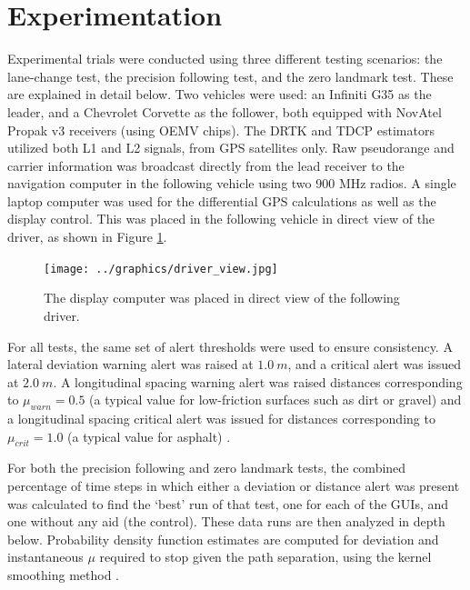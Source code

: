 \documentclass[twocolumn,10pt]{article}
\begin{document}

\section*{Experimentation}

  Experimental trials were conducted using three different testing scenarios: the lane-change test, the precision following test, and the zero landmark test.  These are explained in detail below.
  Two vehicles were used: an Infiniti G35 as the leader, and a Chevrolet Corvette as the follower, both equipped with NovAtel Propak v3 receivers (using OEMV chips).  The DRTK and TDCP estimators utilized both L1 and L2 signals, from GPS satellites only.  Raw pseudorange and carrier information was broadcast directly from the lead receiver to the navigation computer in the following vehicle using two 900 MHz radios.
  A single laptop computer was used for the differential GPS calculations as well as the display control. This was placed in the following vehicle in direct view of the driver, as shown in Figure \ref{fig:driver_view}.

  \begin{figure}[ht] \centering
    \texttt{[image: ../graphics/driver\_view.jpg]}
    \caption{The display computer was placed in direct view of the following driver.}
    \label{fig:driver_view}
  \end{figure}

  For all tests, the same set of alert thresholds were used to ensure consistency. A lateral deviation warning alert was raised at $1.0~m$, and a critical alert was issued at $2.0~m$. A longitudinal spacing warning alert was raised distances corresponding to $\mu_{warn} = 0.5$ (a typical value for low-friction surfaces such as dirt or gravel) and a longitudinal spacing critical alert was issued for distances corresponding to $\mu_{crit}=1.0$ (a typical value for asphalt) \cite{mu}.

  For both the precision following and zero landmark tests, the combined percentage of time steps in which either a deviation or distance alert was present was calculated to find the `best' run of that test, one for each of the GUIs, and one without any aid (the control). These data runs are then analyzed in depth below.  Probability density function estimates are computed for deviation and instantaneous $\mu$ required to stop given the path separation, using the kernel smoothing method \cite{wand1995kernel}.
\end{document}
